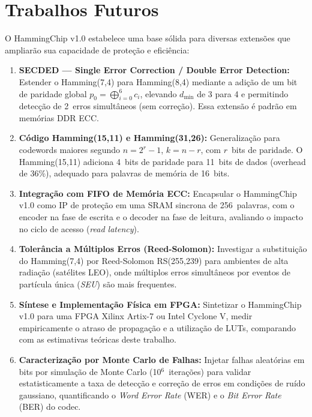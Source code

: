 \documentclass[12pt,a4paper]{article}
\begin{document}
\section{Trabalhos Futuros}

O HammingChip v1.0 estabelece uma base sólida para diversas extensões que ampliarão sua capacidade de proteção e eficiência:

\begin{enumerate}[leftmargin=2em,label=\textbf{TF\arabic*.}]
  \item \textbf{SECDED --- Single Error Correction / Double Error Detection:}
    Estender o Hamming(7,4) para Hamming(8,4) mediante a adição de um bit de paridade global $p_0 = \bigoplus_{i=0}^{6} c_i$, elevando $d_{\min}$ de 3 para 4 e permitindo detecção de 2~erros simultâneos (sem correção). Essa extensão é padrão em memórias DDR ECC.

  \item \textbf{Código Hamming(15,11) e Hamming(31,26):}
    Generalização para codewords maiores segundo $n = 2^r - 1$, $k = n - r$, com $r$~bits de paridade. O Hamming(15,11) adiciona 4~bits de paridade para 11~bits de dados (overhead de 36\%), adequado para palavras de memória de 16~bits.

  \item \textbf{Integração com FIFO de Memória ECC:}
    Encapsular o HammingChip v1.0 como IP de proteção em uma SRAM sincrona de 256~palavras, com o encoder na fase de escrita e o decoder na fase de leitura, avaliando o impacto no ciclo de acesso (\textit{read latency}).

  \item \textbf{Tolerância a Múltiplos Erros (Reed-Solomon):}
    Investigar a substituição do Hamming(7,4) por Reed-Solomon RS(255,239) para ambientes de alta radiação (satélites LEO), onde múltiplos erros simultâneos por eventos de partícula única (\textit{SEU}) são mais frequentes.

  \item \textbf{Síntese e Implementação Física em FPGA:}
    Sintetizar o HammingChip v1.0 para uma FPGA Xilinx Artix-7 ou Intel Cyclone V, medir empiricamente o atraso de propagação e a utilização de LUTs, comparando com as estimativas teóricas deste trabalho.

  \item \textbf{Caracterização por Monte Carlo de Falhas:}
    Injetar falhas aleatórias em bits por simulação de Monte Carlo (10$^6$~iterações) para validar estatisticamente a taxa de detecção e correção de erros em condições de ruído gaussiano, quantificando o \textit{Word Error Rate} (WER) e o \textit{Bit Error Rate} (BER) do codec.
\end{enumerate}
\end{document}
